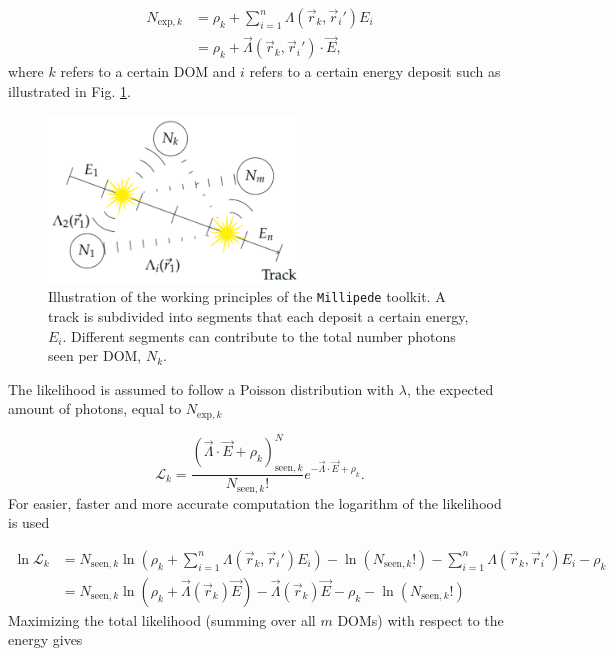 \begin{equation}
\label{eq:n_exp}
\begin{split}
N_{\textrm{exp},k} &= \rho_k + \sum^n_{i=1} \Lambda(\vec{r}_k,\vec{r}_i') E_i\\
&= \rho_k + \vec{\Lambda}(\vec{r}_k,\vec{r}_i') \cdot \vec{E},
\end{split}
\end{equation}
where $k$ refers to a certain DOM and $i$ refers to a certain energy deposit such as illustrated in Fig. \ref{fig:millipede}.

\begin{figure}
\centering
\includegraphics[width=0.6\textwidth]{chapter7/img/millipede.png}
\caption{Illustration of the working principles of the \texttt{Millipede} toolkit. A track is subdivided into segments that each deposit a certain energy, $E_i$. Different segments can contribute to the total number photons seen per DOM, $N_k$.}
\label{fig:millipede}
\end{figure}

The likelihood is assumed to follow a Poisson distribution with $\lambda$, the expected amount of photons, equal to $N_{\textrm{exp},k}$

\begin{equation}
\mathcal{L}_k = \frac{\left(\vec{\Lambda} \cdot \vec{E} + \rho_k \right)^N_{\textrm{seen},k}}{N_{\textrm{seen},k}!} e^{-\vec{\Lambda} \cdot \vec{E} + \rho_k}.
\end{equation}
\noindent For easier, faster and more accurate computation the logarithm of the likelihood is used

\begin{equation}
\begin{split}
\ln \mathcal{L}_k &= N_{\textrm{seen},k} \ln \left(\rho_k + \sum^n_{i=1} \Lambda(\vec{r}_k,\vec{r}_i') E_i \right) - \ln \left(N_{\textrm{seen},k}!\right) - \sum^n_{i=1} \Lambda(\vec{r}_k,\vec{r}_i') E_i - \rho_k\\
&= N_{\textrm{seen},k} \ln \left(\rho_k + \vec{\Lambda}(\vec{r}_k) \vec{E} \right) - \vec{\Lambda}(\vec{r}_k) \vec{E} - \rho_k - \ln\left(N_{\textrm{seen},k}!\right)
\end{split}
\end{equation}
\noindent Maximizing the total likelihood (summing over all $m$ DOMs) with respect to the energy gives 

